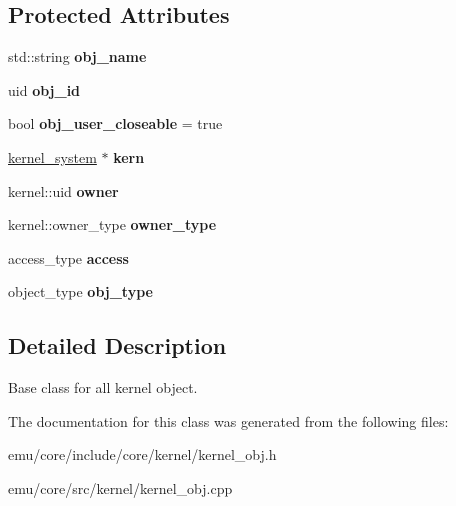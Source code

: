 \subsection*{Protected Attributes}
\begin{DoxyCompactItemize}
\item 
\mbox{\label{classeka2l1_1_1kernel_1_1kernel__obj_a70f7506bf05c41ea29c3d9ed3cd731ae}} 
std\+::string {\bfseries obj\+\_\+name}
\item 
\mbox{\label{classeka2l1_1_1kernel_1_1kernel__obj_abc2bb7538d1da72b10c2abe36e709ad7}} 
uid {\bfseries obj\+\_\+id}
\item 
\mbox{\label{classeka2l1_1_1kernel_1_1kernel__obj_a9f80b810c5a7f133d68174e28b71bf90}} 
bool {\bfseries obj\+\_\+user\+\_\+closeable} = true
\item 
\mbox{\label{classeka2l1_1_1kernel_1_1kernel__obj_aaea65366f001ad0722eeffbcdf459833}} 
\mbox{\hyperlink{classeka2l1_1_1kernel__system}{kernel\+\_\+system}} $\ast$ {\bfseries kern}
\item 
\mbox{\label{classeka2l1_1_1kernel_1_1kernel__obj_ab8943d185cc84790c4f76dde4706104d}} 
kernel\+::uid {\bfseries owner}
\item 
\mbox{\label{classeka2l1_1_1kernel_1_1kernel__obj_a774b6aea079021d37fdff3dcba68c9bf}} 
kernel\+::owner\+\_\+type {\bfseries owner\+\_\+type}
\item 
\mbox{\label{classeka2l1_1_1kernel_1_1kernel__obj_abd097dcd098e6620052c438d8732d875}} 
access\+\_\+type {\bfseries access}
\item 
\mbox{\label{classeka2l1_1_1kernel_1_1kernel__obj_a7eb655727117372165f99800b41eb7cc}} 
object\+\_\+type {\bfseries obj\+\_\+type}
\end{DoxyCompactItemize}


\subsection{Detailed Description}
Base class for all kernel object. 

The documentation for this class was generated from the following files\+:\begin{DoxyCompactItemize}
\item 
emu/core/include/core/kernel/kernel\+\_\+obj.\+h\item 
emu/core/src/kernel/kernel\+\_\+obj.\+cpp\end{DoxyCompactItemize}
